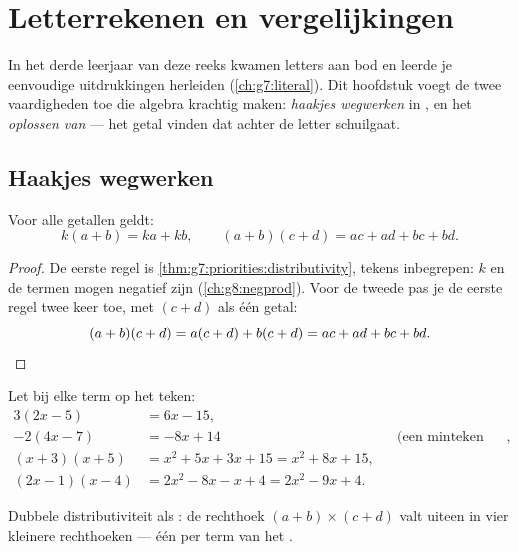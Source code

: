\chapter{Letterrekenen en vergelijkingen}\label{ch:g8:equations}

In het derde leerjaar van deze reeks kwamen letters aan bod en leerde je
eenvoudige uitdrukkingen herleiden (\cref{ch:g7:literal}). Dit hoofdstuk voegt
de twee vaardigheden toe die algebra krachtig maken: \emph{haakjes wegwerken}
in , en het \emph{oplossen van } --- het getal vinden dat
achter de letter schuilgaat.

\section{Haakjes wegwerken}

\begin{theorem}\label{thm:g8:equations:expand}
Voor alle getallen geldt:
\[
k(a + b) = ka + kb,
\qquad
(a + b)(c + d) = ac + ad + bc + bd .
\]
\end{theorem}

\begin{proof}
De eerste regel is \cref{thm:g7:priorities:distributivity}, tekens inbegrepen:
$k$ en de termen mogen negatief zijn (\cref{ch:g8:negprod}). Voor de tweede pas
je de eerste regel twee keer toe, met $(c + d)$ als één getal:
\[
(a + b)(c + d) = a(c + d) + b(c + d) = ac + ad + bc + bd .
\qedhere
\]
\end{proof}

\begin{example}\label{ex:g8:equations:expand}
Let bij elke term op het teken:
\begin{align*}
3(2x - 5) &= 6x - 15, \\
-2(4x - 7) &= -8x + 14
&& \text{(een minteken vooraan keert beide tekens om)}, \\
(x + 3)(x + 5) &= x^2 + 5x + 3x + 15 = x^2 + 8x + 15, \\
(2x - 1)(x - 4) &= 2x^2 - 8x - x + 4 = 2x^2 - 9x + 4 .
\end{align*}
\end{example}

\begin{omfigure}

{\small Dubbele distributiviteit als : de rechthoek
$(a+b) \times (c+d)$ valt uiteen in vier kleinere rechthoeken --- één per term
van het .}
\end{omfigure}


